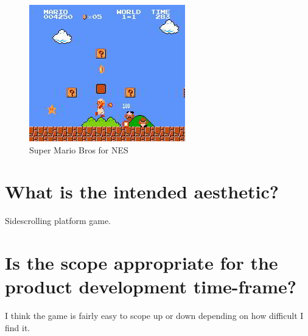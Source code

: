 \documentclass{scrartcl}
\begin{document}
\begin{figure}[]
	\includegraphics[width=0.5\linewidth]{mario.JPG}
	\caption{Super Mario Bros for NES }
\end{figure}



\section{What is the intended aesthetic?}
Sidescrolling platform game.

\section{Is the scope appropriate for the product development time-frame?}
I think the game is fairly easy to scope up or down depending on how difficult I find it. 
	
\end{document}
